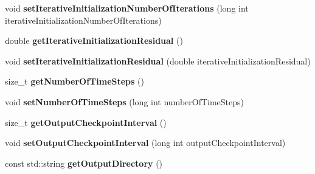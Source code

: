 \begin{DoxyCompactItemize}
\item 
\hypertarget{classnatrium_1_1SolverConfiguration_ac4188dce03b129130f153f7028c3f79e}{void {\bfseries set\-Iterative\-Initialization\-Number\-Of\-Iterations} (long int iterative\-Initialization\-Number\-Of\-Iterations)}\label{classnatrium_1_1SolverConfiguration_ac4188dce03b129130f153f7028c3f79e}

\item 
\hypertarget{classnatrium_1_1SolverConfiguration_a966eee9da52af6fbd1f8d5fad2b8427a}{double {\bfseries get\-Iterative\-Initialization\-Residual} ()}\label{classnatrium_1_1SolverConfiguration_a966eee9da52af6fbd1f8d5fad2b8427a}

\item 
\hypertarget{classnatrium_1_1SolverConfiguration_ad9551932a38bda46c8ca2ef88a73e754}{void {\bfseries set\-Iterative\-Initialization\-Residual} (double iterative\-Initialization\-Residual)}\label{classnatrium_1_1SolverConfiguration_ad9551932a38bda46c8ca2ef88a73e754}

\item 
\hypertarget{classnatrium_1_1SolverConfiguration_a13121a202636553339d5b1f83d196fd7}{size\-\_\-t {\bfseries get\-Number\-Of\-Time\-Steps} ()}\label{classnatrium_1_1SolverConfiguration_a13121a202636553339d5b1f83d196fd7}

\item 
\hypertarget{classnatrium_1_1SolverConfiguration_a50c43893f5c6ed0d73fcccd64f523053}{void {\bfseries set\-Number\-Of\-Time\-Steps} (long int number\-Of\-Time\-Steps)}\label{classnatrium_1_1SolverConfiguration_a50c43893f5c6ed0d73fcccd64f523053}

\item 
\hypertarget{classnatrium_1_1SolverConfiguration_a7b7ffc9156ba827ab74ff6f1d7bd9151}{size\-\_\-t {\bfseries get\-Output\-Checkpoint\-Interval} ()}\label{classnatrium_1_1SolverConfiguration_a7b7ffc9156ba827ab74ff6f1d7bd9151}

\item 
\hypertarget{classnatrium_1_1SolverConfiguration_ab7a39dfb46cb1b0c7b54b92700fd7360}{void {\bfseries set\-Output\-Checkpoint\-Interval} (long int output\-Checkpoint\-Interval)}\label{classnatrium_1_1SolverConfiguration_ab7a39dfb46cb1b0c7b54b92700fd7360}

\item 
\hypertarget{classnatrium_1_1SolverConfiguration_a2a0444878a5fb512772e024bc03ec076}{const std\-::string {\bfseries get\-Output\-Directory} ()}\label{classnatrium_1_1SolverConfiguration_a2a0444878a5fb512772e024bc03ec076}


\end{DoxyCompactItemize}
